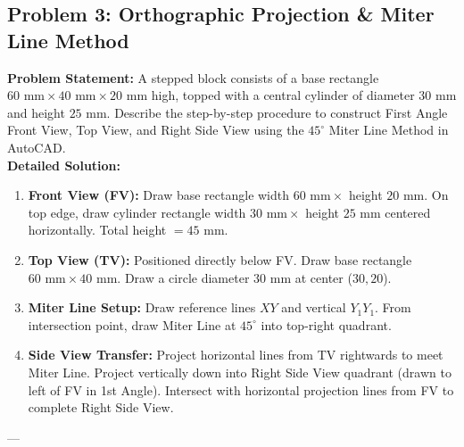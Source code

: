 \subsection{Problem 3: Orthographic Projection \& Miter Line Method}
\textbf{Problem Statement:} A stepped block consists of a base rectangle $60\text{ mm} \times 40\text{ mm} \times 20\text{ mm}$ high, topped with a central cylinder of diameter $30\text{ mm}$ and height $25\text{ mm}$. Describe the step-by-step procedure to construct First Angle Front View, Top View, and Right Side View using the $45^\circ$ Miter Line Method in AutoCAD.\\[4pt]
\textbf{Detailed Solution:}
\begin{enumerate}
    \item \textbf{Front View (FV):} Draw base rectangle width $60\text{ mm} \times$ height $20\text{ mm}$. On top edge, draw cylinder rectangle width $30\text{ mm} \times$ height $25\text{ mm}$ centered horizontally. Total height $= 45\text{ mm}$.
    \item \textbf{Top View (TV):} Positioned directly below FV. Draw base rectangle $60\text{ mm} \times 40\text{ mm}$. Draw a circle diameter $30\text{ mm}$ at center ($30, 20$).
    \item \textbf{Miter Line Setup:} Draw reference lines $XY$ and vertical $Y_1Y_1$. From intersection point, draw Miter Line at $45^\circ$ into top-right quadrant.
    \item \textbf{Side View Transfer:} Project horizontal lines from TV rightwards to meet Miter Line. Project vertically down into Right Side View quadrant (drawn to left of FV in 1st Angle). Intersect with horizontal projection lines from FV to complete Right Side View.
\end{enumerate}

---

